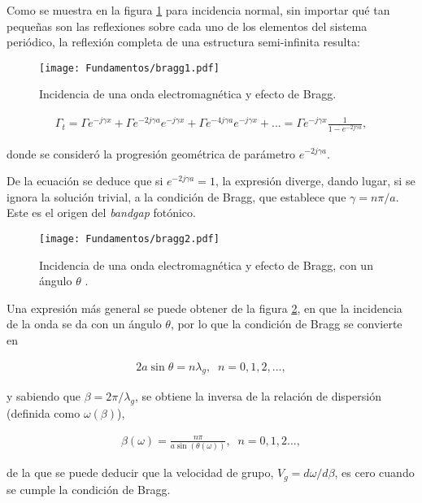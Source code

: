 Como se muestra en la figura \ref{fig:bragg-dibujo} para incidencia normal, sin importar qué tan pequeñas son las reflexiones sobre cada uno de los elementos del sistema periódico, la reflexión completa de una estructura semi-infinita resulta:

\begin{figure}[htp]
	\centering
	\texttt{[image: Fundamentos/bragg1.pdf]}
	\caption{Incidencia de una onda electromagnética y efecto de Bragg.}
	\label{fig:bragg-dibujo}
\end{figure}

\begin{align}
	\Gamma_t = \Gamma e^{-j\gamma x} + \Gamma e^{-2j\gamma a} e^{-j\gamma x} + \Gamma e^{-4j\gamma a} e^{-j\gamma x} + ... = \Gamma e^{-j\gamma x} \frac{1}{1-e^{-2j\gamma a}},
\end{align}

donde se consideró la progresión geométrica de parámetro $e^{-2j\gamma a}$.

De la ecuación se deduce que si $e^{-2j\gamma a} = 1$, la expresión diverge, dando lugar, si se ignora la solución trivial, a la condición de Bragg, que establece que $\gamma = n\pi/a$. Este es el origen del \textit{bandgap} fotónico.

\begin{figure}[htp]
	\centering
	\texttt{[image: Fundamentos/bragg2.pdf]}
	\caption{Incidencia de una onda electromagnética y efecto de Bragg, con un ángulo $\theta$ \cite{Caloz:ElectromagneticMetamaterials}.}
	\label{fig:bragg2}
\end{figure}

Una expresión más general se puede obtener de la figura \ref{fig:bragg2}, en que la incidencia de la onda se da con un ángulo $\theta$, por lo que la condición de Bragg se convierte en

\begin{align}
	2 a \sin\theta = n \lambda_g, \;\; n=0, 1, 2, ...,
\end{align}

y sabiendo que $\beta = 2\pi/\lambda_g$, se obtiene la inversa de la relación de dispersión (definida como $\omega(\beta)$),

\begin{align}
	\beta(\omega) = \frac{n\pi}{a \sin(\theta(\omega))}, \;\; n=0, 1, 2...,
\end{align}

de la que se puede deducir que la velocidad de grupo, $V_g = d\omega/d\beta$, es cero cuando se cumple la condición de Bragg.


